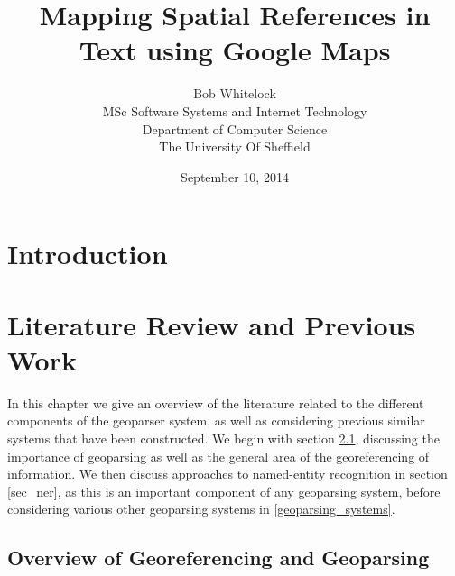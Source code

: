 \documentclass[12pt, a4paper]{report}
\title{Mapping Spatial References in Text using Google Maps}
\date{September 10, 2014}
\author{Bob Whitelock\\ MSc Software Systems and Internet Technology\\ Department of Computer Science\\ The University Of Sheffield}
\begin{document}
\maketitle

\begin{abstract}

\end{abstract}

\tableofcontents

\glsaddall
\printglossaries

\chapter{Introduction}




\chapter{Literature Review and Previous Work}

In this chapter we give an overview of the literature related to the different components of the geoparser system, as well as considering previous similar systems that have been constructed. We begin with section \ref{sec:overview_georeferencing}, discussing the importance of geoparsing as well as the general area of the georeferencing of information. We then discuss approaches to named-entity recognition in section \ref{sec_ner}, as this is an important component of any geoparsing system, before considering various other geoparsing systems in \ref{geoparsing_systems}.


\section{Overview of Georeferencing and Geoparsing}
\label{sec:overview_georeferencing}

\end{document}
